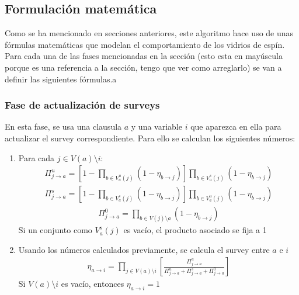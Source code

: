 \subsection{Formulación matemática}
Como se ha mencionado en secciones anteriores, este algoritmo hace uso de unas fórmulas matemáticas que modelan el comportamiento de los vidrios de espín. Para cada una de las fases mencionadas en la sección  (esto esta en mayúscula porque es una referencia a la sección, tengo que ver como arreglarlo) se van a definir las siguientes fórmulas.a
\subsubsection{Fase de actualización de surveys}
En esta fase, se usa una clausula $a$ y una variable $i$ que aparezca en ella para actualizar el survey correspondiente. Para ello se calculan los siguientes números:
\begin{enumerate}
	\item Para cada $j \in V(a) \setminus i$:
	\begin{equation}
		\begin{aligned}
			\Pi_{j \rightarrow a}^{u} = \left[ 1 - \prod_{b \in V_a^u(j)}(1 - \eta_{b\rightarrow j}) \right] \prod_{b \in V_a^s(j)}(1 - \eta_{b\rightarrow j})
		\end{aligned}
	\end{equation}
	\begin{equation}
		\begin{aligned}
			\Pi_{j \rightarrow a}^{s} = \left[ 1 - \prod_{b \in V_a^s(j)}(1 - \eta_{b\rightarrow j}) \right] \prod_{b \in V_a^u(j)}(1 - \eta_{b\rightarrow j})
		\end{aligned}
	\end{equation}
	\begin{equation}
		\begin{aligned}
			\Pi_{j \rightarrow a}^{0} = \prod_{b \in V(j) \setminus a}(1 - \eta_{b\rightarrow j})
		\end{aligned}
	\end{equation}
	Si un conjunto como $V_a^s(j)$ es vacío, el producto asociado se fija a 1
	\item Usando los números calculados previamente, se calcula el survey entre $a$ e $i$
	\begin{equation}
		\begin{aligned}
		\eta_{a\rightarrow i} = \prod_{j\in V(a) \setminus i} \left[\frac{\Pi_{j\rightarrow a}^u}{\Pi_{j\rightarrow a}^u + \Pi_{j\rightarrow a}^s + \Pi_{j\rightarrow a}^0}\right]
		\end{aligned}
	\end{equation}
	Si $V(a)\setminus i$ es vacío, entonces $\eta_{a\rightarrow i} = 1$
\end{enumerate}
